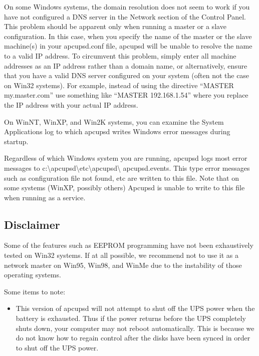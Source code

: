 {{{{{{{{{\label{index-Problems_002c-Windows-178}
\label{index-Windows_002c-Problems-179}
On some Windows systems, the domain resolution does not seem to work if you
have not configured a DNS server in the Network section of the Control Panel.
This problem should be apparent only when running a master or a slave
configuration. In this case, when you specify the name of the master or the
slave machine(s) in your apcupsd.conf file, apcupsd will be unable to resolve
the name to a valid IP address. To circumvent this problem, simply enter all
machine addresses as an IP address rather than a domain name, or
alternatively, ensure that you have a valid DNS server configured on your
system (often not the case on Win32 systems).  For example, instead of using
the directive ``MASTER my.master.com'' use something like ``MASTER
192.168.1.54'' where you replace the IP address with your actual IP address.  

On WinNT, WinXP, and Win2K systems, you can examine the System Applications
log to which apcupsd writes Windows error messages during startup.  

Regardless of which Windows system you are running, apcupsd logs most error
messages to
c:\textbackslash{}apcupsd\textbackslash{}etc\textbackslash{}apcupsd\textbackslash
{}apcupsd.events. This type error messages such as configuration file not
found, etc are written to this file. Note that on some systems (WinXP, possibly
others) Apcupsd is unable to write to this file when running as a service.


\label{Disclaimer}

\subsection*{Disclaimer}

\label{index-Disclaimer-180}
Some of the features such as EEPROM programming have not been exhaustively
tested on Win32 systems. If at all possible, we recommend not to use it as a
network master on Win95, Win98, and WinMe due to the instability of those
operating systems.  

Some items to note:  

\begin{itemize}
\item This version of apcupsd will not attempt to shut off the UPS power when
   the battery is exhausted. Thus if the power returns before the UPS completely
   shuts down, your computer may not reboot automatically. This is because we do
not know how to regain control after the disks have been synced in order to
shut off the UPS power.  


\end{itemize}}}}}}}}}}
